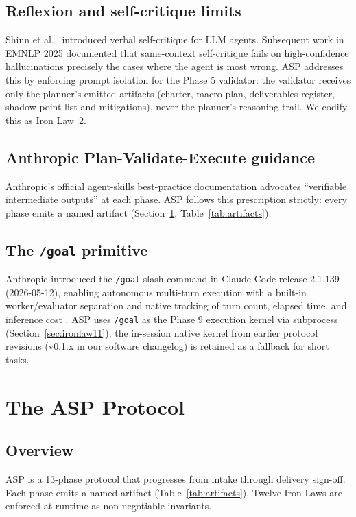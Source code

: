 \documentclass[11pt, a4paper]{article}
\begin{document}
\subsection{Reflexion and self-critique limits}
Shinn et al.~\citep{shinn2023reflexion} introduced verbal self-critique for LLM agents. Subsequent work in EMNLP 2025 documented that same-context self-critique fails on high-confidence hallucinations precisely the cases where the agent is most wrong. ASP addresses this by enforcing prompt isolation for the Phase 5 validator: the validator receives only the planner's emitted artifacts (charter, macro plan, deliverables register, shadow-point list and mitigations), never the planner's reasoning trail. We codify this as Iron Law~2.

\subsection{Anthropic Plan-Validate-Execute guidance}
Anthropic's official agent-skills best-practice documentation \citep{anthropic2026skillbest} advocates ``verifiable intermediate outputs'' at each phase. ASP follows this prescription strictly: every phase emits a named artifact (Section~\ref{sec:protocol}, Table~\ref{tab:artifacts}).

\subsection{The \texttt{/goal} primitive}
Anthropic introduced the \texttt{/goal} slash command in Claude Code release 2.1.139 (2026-05-12), enabling autonomous multi-turn execution with a built-in worker/evaluator separation and native tracking of turn count, elapsed time, and inference cost \citep{explainx2026goal, venturebeat2026goal}. ASP uses \texttt{/goal} as the Phase 9 execution kernel via subprocess (Section~\ref{sec:ironlaw11}); the in-session native kernel from earlier protocol revisions (v0.1.x in our software changelog) is retained as a fallback for short tasks.

\section{The ASP Protocol}
\label{sec:protocol}

\subsection{Overview}
ASP is a 13-phase protocol that progresses from intake through delivery sign-off. Each phase emits a named artifact (Table~\ref{tab:artifacts}). Twelve Iron Laws are enforced at runtime as non-negotiable invariants.
\end{document}
